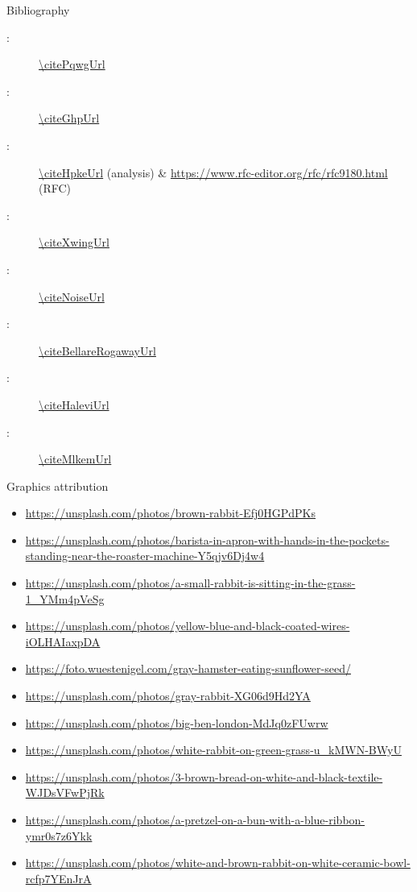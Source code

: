 \begin{frame}{Bibliography}
  \begin{description}
    \item[\citePqwg:] \url{\citePqwgUrl}
    \item[\citeGhp:] \url{\citeGhpUrl}
    \item[\citeHpke:] \url{\citeHpkeUrl} (analysis) \& \url{https://www.rfc-editor.org/rfc/rfc9180.html} (RFC)
    \item[\citeXwing:] \url{\citeXwingUrl}
    \item[\citeNoise:] \url{\citeNoiseUrl}
    \item[\citeBellareRogaway:] \url{\citeBellareRogawayUrl}
    \item[\citeHalevi:]  \url{\citeHaleviUrl}
    \item[\citeMlkem:]  \url{\citeMlkemUrl}
  \end{description}
\end{frame}

\begin{frame}{Graphics attribution}
  \tiny
  \begin{itemize}
    \item \url{https://unsplash.com/photos/brown-rabbit-Efj0HGPdPKs}
    \item \url{https://unsplash.com/photos/barista-in-apron-with-hands-in-the-pockets-standing-near-the-roaster-machine-Y5qjv6Dj4w4}
    \item \url{https://unsplash.com/photos/a-small-rabbit-is-sitting-in-the-grass-1_YMm4pVeSg}
    \item \url{https://unsplash.com/photos/yellow-blue-and-black-coated-wires-iOLHAIaxpDA}
    \item \url{https://foto.wuestenigel.com/gray-hamster-eating-sunflower-seed/}
    \item \url{https://unsplash.com/photos/gray-rabbit-XG06d9Hd2YA}
    \item \url{https://unsplash.com/photos/big-ben-london-MdJq0zFUwrw}
    \item \url{https://unsplash.com/photos/white-rabbit-on-green-grass-u_kMWN-BWyU}
    \item \url{https://unsplash.com/photos/3-brown-bread-on-white-and-black-textile-WJDsVFwPjRk}
    \item \url{https://unsplash.com/photos/a-pretzel-on-a-bun-with-a-blue-ribbon-ymr0s7z6Ykk}
    \item \url{https://unsplash.com/photos/white-and-brown-rabbit-on-white-ceramic-bowl-rcfp7YEnJrA}
  \end{itemize}
\end{frame}
